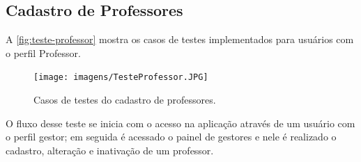 \subsection{Cadastro de Professores}
A \autoref{fig:teste-professor} mostra os casos de testes implementados para usuários com o perfil Professor. 

\begin{figure}[htb]
    \centering
	\texttt{[image: imagens/TesteProfessor.JPG]}
	\caption{\label{fig:teste-professor} Casos de testes do cadastro de professores.}
\end{figure}

O fluxo desse teste se inicia com o acesso na aplicação através de um usuário com o perfil gestor; em seguida é acessado o painel de gestores e nele é realizado o cadastro, alteração e inativação de um professor.

  